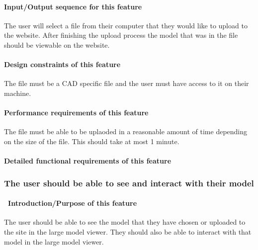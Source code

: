 \documentclass[letterpaper, 10pt, draftclsnofoot, onecolumn]{IEEEtran}
\begin{document}
{\paragraph[Input/Output sequence for this
feature]{\rmfamily\bfseries\color{black}
Input/Output sequence for this feature}
{\color{black}
The user will select a file from their computer that they would like to upload to the website. After finishing the upload process the 
model that was in the file should be viewable on the website. }

\paragraph[Design constraints of this
feature]{\rmfamily\bfseries\color{black} Design
constraints of this feature}
{\color{black}
The file must be a CAD specific file and the user must have access to it on their machine. }

\paragraph[Performance requirements of this
feature]{\rmfamily\bfseries\color{black}
Performance requirements of this feature}
{\color{black}
The file must be able to be uplaoded in a reasonable amount of time depending on the size of the file. This should take at most 1 minute. }

\paragraph[Detailed functional requirements of this
feature]{\rmfamily\bfseries\color{black}
Detailed functional requirements of this feature}


\subsubsection[{Viewable model}]{\rmfamily\bfseries\color{black}The user should be able to see and interact with their model}
\paragraph[\ Introduction/Purpose of this
feature]{\foreignlanguage{english}{\ }\foreignlanguage{english}{Introduction/Purpose
of this feature}}
{\color{black}
The user should be able to see the model that they have chosen or uploaded to the site in the large model viewer. They should also be able to
interact with that model in the large model viewer.  }

}
\end{document}

